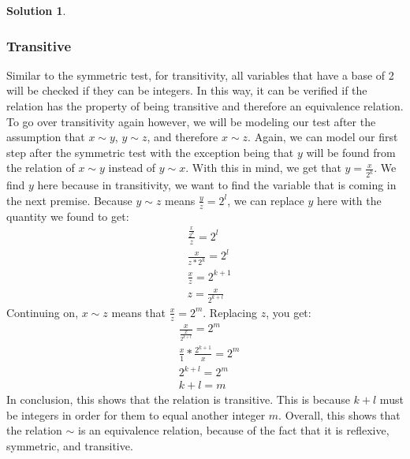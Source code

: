\documentclass{article}
\theoremstyle{definition}
\newtheorem*{solution}{Solution}
\begin{document}
\begin{solution}
\subsubsection*{Transitive}
Similar to the symmetric test, for transitivity, all variables that have a base of 2 will be checked if they can be integers. In this way, it can be verified if the relation has the property of being transitive and therefore an equivalence relation. To go over transitivity again however, we will be modeling our test after the assumption that $x \sim y$, $y \sim z$, and therefore $x \sim z$. Again, we can model our first step after the symmetric test with the exception being that $y$ will be found from the relation of $x \sim y$ instead of $y \sim x$. With this in mind, we get that $y = \frac{x}{2^k}$. We find $y$ here because in transitivity, we want to find the variable that is coming in the next premise. Because $y \sim z$ means $\frac{y}{z} = 2^l$, we can replace $y$ here with the quantity we found to get:
\begin{align}
&\frac{\frac{x}{2^k}}{z} = 2^l\\
&\frac{x}{z*2^k} = 2^l\\
&\frac{x}{z} = 2^{k+1}\\
& z = \frac{x}{2^{k+l}}
\end{align}
\setcounter{equation}{0}
Continuing on, $x \sim z$ means that $\frac{x}{z} = 2^m$. Replacing $z$, you get:
\begin{align}
&\frac{x}{\frac{x}{2^{k+l}}} = 2^m\\
&\frac{x}{1} * \frac{2^{k+1}}{x} = 2^m\\
&2^{k+l} = 2^m\\
&k+l = m
\end{align}
In conclusion, this shows that the relation is transitive. This is because $k+l$ must be integers in order for them to equal another integer $m$. Overall, this shows that the relation $\sim$ is an equivalence relation, because of the fact that it is reflexive, symmetric, and transitive.
\end{solution}
\end{document}
